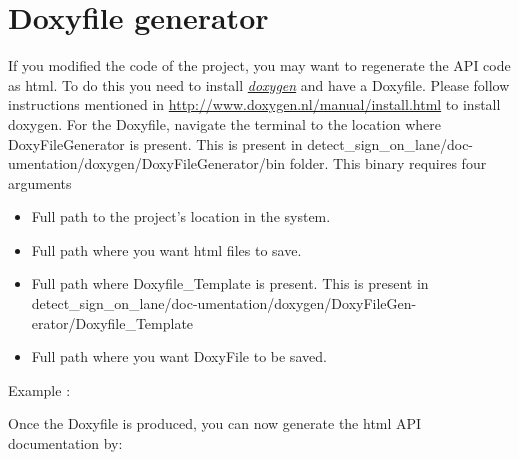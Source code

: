 \section{Doxyfile generator}
If you modified the code of the project, you may want to regenerate the API code as html. To do this you need to install \href{http://www.doxygen.nl/index.html}{\emph{doxygen}} and have a Doxyfile. Please follow instructions mentioned in \href{http://www.doxygen.nl/manual/install.html}{http://www.doxygen.nl/manual/install.html} to install doxygen. For the Doxyfile, navigate the terminal to the location where DoxyFileGenerator is present. This is present in detect\_sign\_on\_lane/doc-umentation/doxygen/DoxyFileGenerator/bin folder. This binary requires four arguments
\begin{itemize}
    \item Full path to the project's location in the system.
    \item Full path where you want html files to save.
    \item Full path where Doxyfile\_Template is present. This is present in detect\_sign\_on\_lane/doc-umentation/doxygen/DoxyFileGen-erator/Doxyfile\_Template
    \item Full path where you want DoxyFile to be saved.
\end{itemize}
Example :

Once the Doxyfile is produced, you can now generate the html API documentation by:
